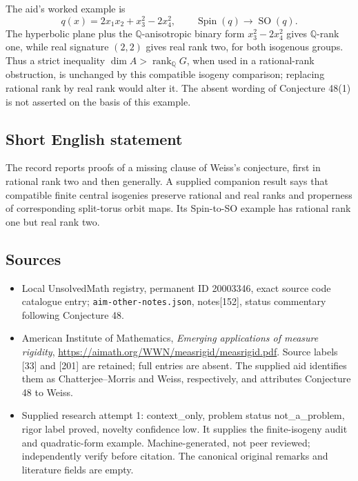 \documentclass[11pt]{article}
\newcommand{\Q}{\mathbb{Q}}
\begin{document}
The aid's worked example is
\[
 q(x)=2x_1x_2+x_3^2-2x_4^2,\qquad
 \operatorname{Spin}(q)\longrightarrow\operatorname{SO}(q).
\]
The hyperbolic plane plus the $\Q$-anisotropic binary form $x_3^2-2x_4^2$ gives $\Q$-rank one, while real signature $(2,2)$ gives real rank two, for both isogenous groups. Thus a strict inequality $\dim A>\operatorname{rank}_{\Q}G$, when used in a rational-rank obstruction, is unchanged by this compatible isogeny comparison; replacing rational rank by real rank would alter it. The absent wording of Conjecture 48(1) is not asserted on the basis of this example.
\subsection{Short English statement}
The record reports proofs of a missing clause of Weiss's conjecture, first in rational rank two and then generally. A supplied companion result says that compatible finite central isogenies preserve rational and real ranks and properness of corresponding split-torus orbit maps. Its Spin-to-SO example has rational rank one but real rank two.
\subsection{Sources}
\begin{itemize}
\item Local UnsolvedMath registry, permanent ID 20003346, exact source code catalogue entry; \texttt{aim-other-notes.json}, notes[152], status commentary following Conjecture 48.
\item American Institute of Mathematics, \emph{Emerging applications of measure rigidity}, \url{https://aimath.org/WWN/measrigid/measrigid.pdf}. Source labels [33] and [201] are retained; full entries are absent. The supplied aid identifies them as Chatterjee--Morris and Weiss, respectively, and attributes Conjecture 48 to Weiss.
\item Supplied research attempt 1: context\_only, problem status not\_a\_problem, rigor label proved, novelty confidence low. It supplies the finite-isogeny audit and quadratic-form example. Machine-generated, not peer reviewed; independently verify before citation. The canonical original remarks and literature fields are empty.
\end{itemize}
\end{document}
